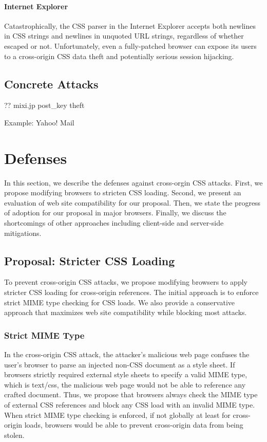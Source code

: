 \documentclass{acm_proc_article-sp}
\begin{document}
{\paragraph{Internet Explorer}
Catastrophically, the CSS parser in the Internet Explorer accepts both newlines in CSS strings and newlines in unquoted URL strings, regardless of whether escaped or not. Unfortunately, even a fully-patched browser can expose its users to a cross-origin CSS data theft and potentially serious session hijacking.

\subsection{Concrete Attacks}
?? mixi.jp post\_key theft\cite{cssxss}

Example: Yahoo! Mail

\section{Defenses}
In this section, we describe the defenses against cross-orgin CSS attacks. First, we propose modifying browsers to stricten CSS loading. Second, we present an evaluation of web site compatibility for our proposal. Then, we state the progress of adoption for our proposal in major browsers. Finally, we discuss the shortcomings of other approaches including client-side and server-side mitigations.

\subsection{Proposal: Stricter CSS Loading}
To prevent cross-origin CSS attacks, we propose modifying browsers to apply stricter CSS loading for cross-origin references. The initial approach is to enforce strict MIME type checking for CSS loads. We also provide a conservative approach that maximizes web site compatibility while blocking most attacks.

\subsubsection{Strict MIME Type}
In the cross-origin CSS attack, the attacker's malicious web page confuses the user's browser to parse an injected non-CSS document as a style sheet. If browsers strictly required external style sheets to specify a valid MIME type, which is text/css, the malicious web page would not be able to reference any crafted document. Thus, we propose that browsers always check the MIME type of external CSS references and block any CSS load with an invalid MIME type. When strict MIME type checking is enforced, if not globally at least for cross-origin loads, browsers would be able to prevent cross-origin data from being stolen. 

}
\end{document}
